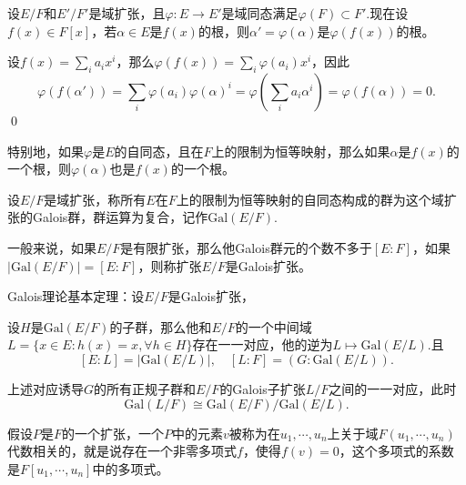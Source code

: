\lem 设$E/F$和$E'/F'$是域扩张，且$\varphi:E\to E'$是域同态满足$\varphi(F)\subset F'$.现在设$f(x)\in F[x]$，若$\alpha\in E$是$f(x)$的根，则$\alpha'=\varphi(\alpha)$是$\varphi(f(x))$的根。

\proof 设$f(x)=\sum_i a_i x^i$，那么$\varphi(f(x))=\sum_i \varphi(a_i) x^i$，因此
\[
	\varphi(f(\alpha'))=\sum_i \varphi(a_i) \varphi(\alpha)^i=\varphi\left(\sum_i a_i\alpha^i\right)=\varphi\left(f(\alpha)\right)=0.
\]\qed

特别地，如果$\varphi$是$E$的自同态，且在$F$上的限制为恒等映射，那么如果$\alpha$是$f(x)$的一个根，则$\varphi(\alpha)$也是$f(x)$的一个根。

\para 设$E/F$是域扩张，称所有$E$在$F$上的限制为恒等映射的自同态构成的群为这个域扩张的Galois群，群运算为复合，记作$\mathrm{Gal}(E/F)$.

一般来说，如果$E/F$是有限扩张，那么他Galois群元的个数不多于$[E:F]$，如果$|\mathrm{Gal}(E/F)|=[E:F]$，则称扩张$E/F$是Galois扩张。

\theo Galois理论基本定理：设$E/F$是Galois扩张，

 设$H$是$\mathrm{Gal}(E/F)$的子群，那么他和$E/F$的一个中间域$L=\{x\in E:h(x)=x,\forall h\in H\}$存在一一对应，他的逆为$L\mapsto \mathrm{Gal}(E/L)$.且
\[
[E:L]=|\mathrm{Gal}(E/L)|,\quad [L:F]=(G:\mathrm{Gal}(E/L)).
\]

 上述对应诱导$G$的所有正规子群和$E/F$的Galois子扩张$L/F$之间的一一对应，此时
\[
	\mathrm{Gal}(L/F)\cong \mathrm{Gal}(E/F)/\mathrm{Gal}(E/L).
\]

\para 假设$P$是$F$的一个扩张，一个$P$中的元素$v$被称为在$u_1,\cdots ,u_n$上关于域$F(u_1,\cdots ,u_n)$代数相关的，就是说存在一个非零多项式$f$，使得$f(v)=0$，这个多项式的系数是$F[u_1,\cdots ,u_n]$中的多项式。